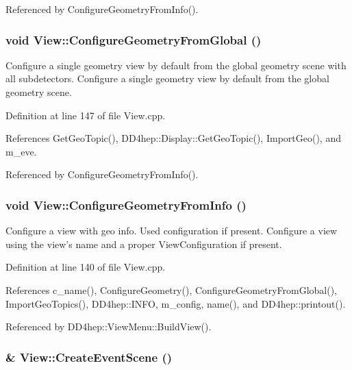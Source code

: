 Referenced by ConfigureGeometryFromInfo().\hypertarget{class_d_d4hep_1_1_view_a2bf3fea77f89710cbccb03dbf8398501}{
\subsubsection[{ConfigureGeometryFromGlobal}]{\setlength{\rightskip}{0pt plus 5cm}void View::ConfigureGeometryFromGlobal ()}}
\label{class_d_d4hep_1_1_view_a2bf3fea77f89710cbccb03dbf8398501}


Configure a single geometry view by default from the global geometry scene with all subdetectors. Configure a single geometry view by default from the global geometry scene. 

Definition at line 147 of file View.cpp.

References GetGeoTopic(), DD4hep::Display::GetGeoTopic(), ImportGeo(), and m\_\-eve.

Referenced by ConfigureGeometryFromInfo().\hypertarget{class_d_d4hep_1_1_view_af573f4aceff18a93fd91b2678de0ae8e}{
\subsubsection[{ConfigureGeometryFromInfo}]{\setlength{\rightskip}{0pt plus 5cm}void View::ConfigureGeometryFromInfo ()}}
\label{class_d_d4hep_1_1_view_af573f4aceff18a93fd91b2678de0ae8e}


Configure a view with geo info. Used configuration if present. Configure a view using the view's name and a proper ViewConfiguration if present. 

Definition at line 140 of file View.cpp.

References c\_\-name(), ConfigureGeometry(), ConfigureGeometryFromGlobal(), ImportGeoTopics(), DD4hep::INFO, m\_\-config, name(), and DD4hep::printout().

Referenced by DD4hep::ViewMenu::BuildView().\hypertarget{class_d_d4hep_1_1_view_a405104d10cef9018701601ae5346d89d}{
\subsubsection[{CreateEventScene}]{ \& View::CreateEventScene ()}}
\label{class_d_d4hep_1_1_view_a405104d10cef9018701601ae5346d89d}


